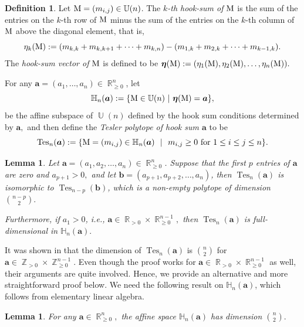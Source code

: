 \documentclass[12pt]{amsart}
\numberwithin{equation}{section}
\newtheorem{lem}[thm]{Lemma}
\theoremstyle{definition}
\newtheorem{defn}[thm]{Definition}
\def\tes{\operatorname{Tes}}
\def\ba{{\boldsymbol{a}}}
\def\bb{{\boldsymbol{b}}}
\def\Hs{\boldsymbol{\eta}}
\def\hs{\eta}
\def\MM{{\rm{M}}}
\def\U{\operatorname{\mathbb{U}}}
\def\Z{\operatorname{\mathbb{Z}}}
\def\R{\operatorname{\mathbb{R}}}
\def\H{\mathbb{H}}
\begin{document}
\begin{defn}\label{defn:tesler}
Let $\MM=(m_{i,j}) \in \U(n)$.
The \emph{$k$-th hook-sum of $\MM$} is the sum of the entries on the $k$-th row of $\MM$ minus the sum of the entries on the $k$-th column of $\MM$ above the diagonal element, that is,
\[\hs_k(\MM) :=(m_{k,k}+m_{k,k+1}+\cdots+m_{k,n}) - (m_{1,k}+m_{2,k}+\cdots+m_{k-1,k}).\]
The \emph{hook-sum vector of $\MM$} is defined to be 
$\Hs(\MM) :=(\hs_1(\MM), \hs_2(\MM),\dots, \hs_n(\MM)).$

For any $\ba=(a_1,\dots,a_n) \in \R_{\geq 0}^{n}$, let
\begin{equation}\label{eq:defn-Hn}
  \H_n(\ba):=\{\MM \in \U(n)~|~\Hs(\MM)=\ba  \},
\end{equation}
be the affine subspace of $\U(n)$ defined by the hook sum conditions determined by $\ba,$ and then define the \emph{Tesler polytope of hook sum $\ba$} to be
\begin{equation}
  \tes_{n}(\ba) := \{\MM=(m_{i,j}) \in \H_n(\ba)~~|~~m_{i,j} \geq 0 \text{ for $1 \le i \le j \le n$} \}. 
	\label{eq:defntesler}
\end{equation}
\end{defn}

\begin{lem}\label{lem:Tes-dim}
  Let $\ba=(a_1, a_2,\dots, a_n) \in \R_{\geq 0}^{n}$. Suppose that the first $p$ entries of $\ba$ are zero and $a_{p+1} > 0,$ and let $\bb = (a_{p+1}, a_{p+2}, \dots, a_n)$, then $\tes_{n}(\ba)$ is isomorphic to $\tes_{n-p}(\bb)$, which is a non-empty polytope of dimension $\binom{n-p}{2}.$
  
  Furthermore, if $a_1 > 0$, i.e., $\ba \in \R_{>0} \times \R_{\ge 0}^{n-1},$ then $\tes_n(\ba)$ is full-dimensional in $\H_n(\ba).$
  
\end{lem}

It was shown in \cite[Corollary 2.6]{Meszaros2017} that the dimension of $\tes_{n}(\ba)$ is $\binom{n}{2}$ for $\ba \in \Z_{>0} \times \Z_{\ge 0}^{n-1}.$ Even though the proof works for $\ba \in \R_{>0} \times \R_{\ge 0}^{n-1}$ as well, their arguments are quite involved. Hence, we provide an alternative and more straightforward proof below. We need the following result on $\H_n(\ba)$, which follows from elementary linear algebra.

\begin{lem}\label{lem:Hn-dim}
  For any $\ba \in \R_{\ge 0}^n,$ the affine space $\H_n(\ba)$ has dimension $\binom{n}{2}.$
\end{lem}
\end{document}

